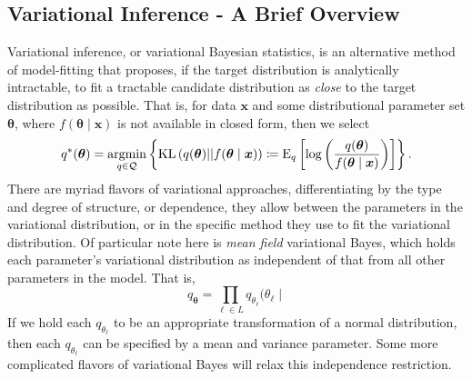 \subsection{Variational Inference - A Brief Overview\label{ref:varbayes}}
Variational inference, or variational Bayesian statistics, is an alternative method of 
    model-fitting that proposes, if the target distribution is analytically intractable,
    to fit a tractable candidate distribution as \emph{close} to the target distribution
    as possible.  That is, for data $\bm{x}$ and some distributional parameter set $\bm{\theta}$,
    where $f(\bm{\theta}\mid \bm{x})$ is not available in closed form, then we select
    \begin{equation}
        \label{eqn:optimalq}
        q^*(\bm{\theta}) = \operatorname*{argmin}_{q\in\mathcal{Q}}\left\lbrace
        \text{KL}\left(q(\bm{\theta})||f(\bm{\theta}\mid\bm{x})\right) 
        \coloneqq
        \text{E}_{q}\left[\log\left(
        \frac{q(\bm{\theta})}{f(\bm{\theta}\mid\bm{x})}
        \right)\right]
        \right\rbrace.
    \end{equation}
    There are myriad flavors of variational approaches, differentiating by
    the type and degree of structure, or dependence, they allow between the parameters in
    the variational distribution, or in the specific method they use to fit the variational
    distribution.  Of particular note here is \emph{mean field} variational Bayes, which 
    holds each parameter's variational distribution as independent of that from all other 
    parameters in the model.  That is,
    \[
        q_{\bm{\theta}} = \prod_{\ell \in L}q_{\theta_{\ell}}(\theta_{\ell}\mid
    \]
    If we hold each $q_{\theta_{\ell}}$ to be an appropriate transformation of a normal
    distribution, then each $q_{\theta_{\ell}}$ can be specified by a mean and variance 
    parameter. Some \needcite more complicated flavors of variational Bayes will relax 
    this independence restriction.

